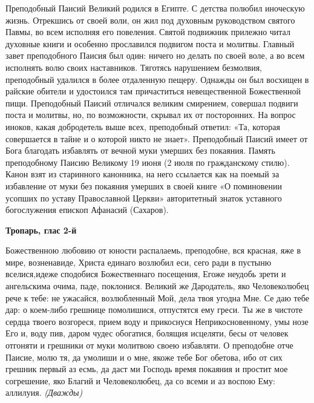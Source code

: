 






Преподобный Паисий Великий родился в Египте. С детства полюбил иноческую жизнь. Отрекшись от своей воли, он жил под духовным руководством святого Павмы, во всем исполняя его повеления. Святой подвижник прилежно читал духовные книги и особенно прославился подвигом поста и молитвы. Главный завет преподобного Паисия был один: ничего но делать по своей воле, а во всем исполнять волю своих наставников. Тяготясь нарушением безмолвия, преподобный удалился в более отдаленную пещеру. Однажды он был восхищен в райские обители и удостоился там причаститься невещественной Божественной пищи. Преподобный Паисий отличался великим смирением, совершал подвиги поста и молитвы, но, по возможности, скрывал их от посторонних. На вопрос иноков, какая добродетель выше всех, преподобный ответил: «Та, которая совершается в тайне и о которой никто не знает». Преподобный Паисий имеет от Бога благодать избавлять от вечной муки умерших без покаяния. Память преподобному Паисию Великому 19 июня (2 июля по гражданскому стилю). Канон взят из старинного канонника, на него ссылается как на поемый за избавление от муки без покаяния умерших в своей книге «О поминовении усопших по уставу Православной Церкви» авторитетный знаток уставного богослужения епископ Афанасий (Сахаров).





\bfseries Тропарь, глас 2-й\normalfont{}


Божественною любовию от юности распалаемь, преподобне, вся красная, яже в мире, возненавиде, Христа единаго возлюбил еси, сего ради в пустыню вселися,идеже сподобися Божественнаго посещения, Егоже неудобь зрети и ангельскима очима, паде, поклонися. Великий же Дародатель, яко Человеколюбец рече к тебе: не ужасайся, возлюбленный Мой, дела твоя угодна Мне. Се даю тебе дар: о коем-либо грешнице помолишися, отпустятся ему греси. Ты же в чистоте сердца твоего возгореся, прием воду и прикоснуся Неприкосновенному, умы нозе Его и, воду пив, даром чудес обогатися, болящия исцеляти, бесы от человек отгоняти и грешники от муки молитвою своею избавляти. О преподобне отче Паисие, молю тя, да умолиши и о мне, якоже тебе Бог обетова, ибо от сих грешник первый аз есмь, да даст ми Господь время покаяния и простит мое согрешение, яко Благий и Человеколюбец, да со всеми и аз воспою Ему: аллилуия. \itshape (Дважды)\normalfont{}


